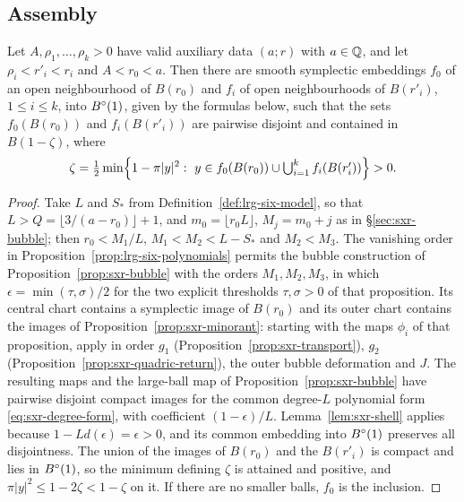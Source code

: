\subsection{Assembly}\label{sec:sxr-proof}

\begin{theorem}[One large ball, $n=3$]\label{thm:lrg-six}\label{thm:sxr-packing}
Let $A,\rho_1,\dots,\rho_k>0$ have valid auxiliary data $(a;r)$ with $a\in\mathbb{Q}$, and let $\rho_i<r'_i<r_i$ and
$A<r_0<a$. Then there are smooth symplectic embeddings $f_0$ of an open neighbourhood of $B(r_0)$ and $f_i$ of open
neighbourhoods of $B(r'_i)$, $1\le i\le k$, into $B^{\circ}(1)$, given by the formulas below, such that the sets $f_0(B(r_0))$
and $f_i(B(r'_i))$ are pairwise disjoint and contained in $B(1-\zeta)$, where
\[
 \zeta=\tfrac12\min\Bigl\{1-\pi|y|^2:\ y\in\textstyle f_0(B(r_0))\cup\bigcup_{i=1}^kf_i(B(r'_i))\Bigr\}>0 .
\]
\end{theorem}

\begin{proof}
Take $L$ and $S_*$ from Definition~\ref{def:lrg-six-model}, so that $L>Q=\lfloor3/(a-r_0)\rfloor+1$,
and $m_0=\lfloor r_0L\rfloor$, $M_j=m_0+j$ as in \S\ref{sec:sxr-bubble}; then $r_0<M_1/L$,
$M_1<M_2<L-S_*$ and $M_2<M_3$. The vanishing order in Proposition~\ref{prop:lrg-six-polynomials}
permits the bubble construction of Proposition~\ref{prop:sxr-bubble} with the orders $M_1,M_2,M_3$, in which
$\epsilon=\min(\tau,\sigma)/2$ for the two explicit thresholds $\tau,\sigma>0$ of that proposition. Its central chart
contains a symplectic image of $B(r_0)$ and its outer chart contains the images of
Proposition~\ref{prop:sxr-minorant}: starting with the maps $\phi_i$ of that proposition, apply in order $g_1$ (Proposition~\ref{prop:sxr-transport}), $g_2$
(Proposition~\ref{prop:sxr-quadric-return}), the outer bubble deformation and $J$. The resulting maps and the large-ball map of Proposition~\ref{prop:sxr-bubble} have
pairwise disjoint compact images for the common degree-$L$ polynomial form \eqref{eq:sxr-degree-form}, with coefficient
$(1-\epsilon)/L$. Lemma~\ref{lem:sxr-shell} applies because $1-Ld(\epsilon)=\epsilon>0$, and its common embedding into
$B^{\circ}(1)$ preserves all disjointness. The union of the images of $B(r_0)$ and the $B(r'_i)$ is compact and lies in $B^{\circ}(1)$, so
the minimum defining $\zeta$ is attained and positive, and $\pi|y|^2\le1-2\zeta<1-\zeta$ on it. If there are no smaller
balls, $f_0$ is the inclusion.
\end{proof}
